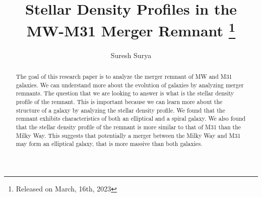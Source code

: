 \documentclass[preprint2, times]{aastex631}
\begin{document}
\title{Stellar Density Profiles in the MW-M31 Merger Remnant
\footnote{Released on March, 16th, 2023}}

\author{Suresh Surya}
\begin{abstract}
The goal of this research paper is to analyze the merger remnant of MW and M31 galaxies. We can understand more about the evolution of galaxies by analyzing merger remnants. The question that we are looking to answer is what is the stellar density profile of the remnant. This is important because we can learn more about the structure of a galaxy by analyzing the stellar density profile. We found that the remnant exhibits characteristics of both an elliptical and a spiral galaxy. We also found that the stellar density profile of the remnant is more similar to that of M31 than the Milky Way. This suggests that potentially a merger between the Milky Way and M31 may form an elliptical galaxy, that is more massive than both galaxies.
\end{abstract}
\end{document}
